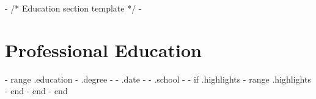 {{- /* Education section template */ -}}
\section{Professional Education}
  \resumeSubHeadingListStart
{{- range .education}}
    \resumeSubheading
      { {{- .degree -}} }{ {{- .date -}} }
      { {{- .school -}} }{}
{{- if .highlights}}
      \resumeItemListStart
{{- range .highlights}}
{{- end}}
      \resumeItemListEnd
{{- end}}
{{- end}}
  \resumeSubHeadingListEnd
